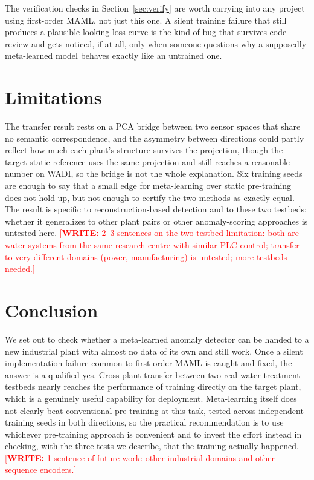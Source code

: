 \documentclass[conference]{IEEEtran}
\newcommand{\authorwrite}[1]{\textcolor{red}{[\textbf{WRITE:} #1]}}
\begin{document}
The verification checks in Section~\ref{sec:verify} are worth carrying into
any project using first-order MAML, not just this one. A silent training
failure that still produces a plausible-looking loss curve is the kind of
bug that survives code review and gets noticed, if at all, only when someone
questions why a supposedly meta-learned model behaves exactly like an
untrained one.

\section{Limitations}

The transfer result rests on a PCA bridge between two sensor spaces that
share no semantic correspondence, and the asymmetry between directions could
partly reflect how much each plant's structure survives the projection,
though the target-static reference uses the same projection and still
reaches a reasonable number on WADI, so the bridge is not the whole
explanation. Six training seeds are enough to say that a small edge for
meta-learning over static pre-training does not hold up, but not enough to
certify the two methods as exactly equal. The result is specific to
reconstruction-based detection and to these two testbeds; whether it
generalizes to other plant pairs or other anomaly-scoring approaches is
untested here.
\authorwrite{2--3 sentences on the two-testbed limitation: both are water systems from the same research centre with similar PLC control; transfer to very different domains (power, manufacturing) is untested; more testbeds needed.}

\section{Conclusion}

We set out to check whether a meta-learned anomaly detector can be handed to
a new industrial plant with almost no data of its own and still work. Once a
silent implementation failure common to first-order MAML is caught and
fixed, the answer is a qualified yes. Cross-plant transfer between two real
water-treatment testbeds nearly reaches the performance of training directly
on the target plant, which is a genuinely useful capability for deployment.
Meta-learning itself does not clearly beat conventional pre-training at this
task, tested across independent training seeds in both directions, so the
practical recommendation is to use whichever pre-training approach is
convenient and to invest the effort instead in checking, with the three
tests we describe, that the training actually happened.
\authorwrite{1 sentence of future work: other industrial domains and other sequence encoders.}
\end{document}
